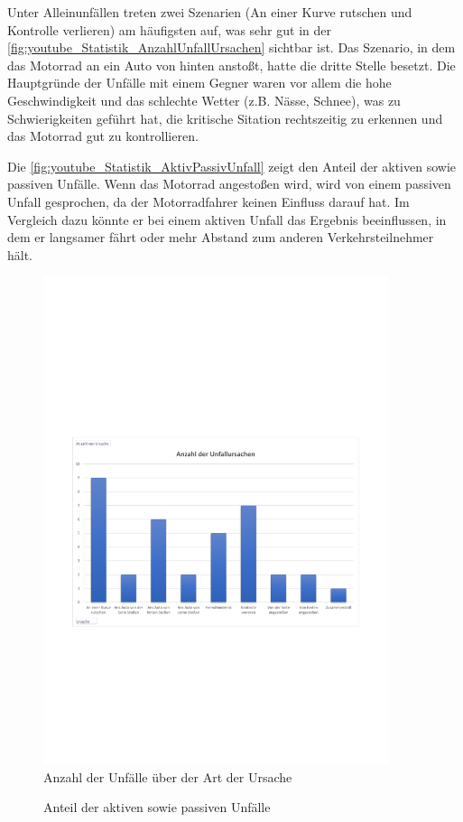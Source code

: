 Unter Alleinunfällen treten zwei Szenarien (An einer Kurve rutschen und Kontrolle verlieren) am häufigsten auf, was sehr gut in der \autoref{fig:youtube_Statistik_AnzahlUnfallUrsachen} sichtbar ist. Das Szenario, in dem das Motorrad an ein Auto von hinten anstoßt, hatte die dritte Stelle besetzt. Die Hauptgründe der Unfälle mit einem Gegner waren vor allem die hohe Geschwindigkeit und das schlechte Wetter (z.B. Nässe, Schnee), was zu Schwierigkeiten geführt hat, die kritische Sitation rechtszeitig zu erkennen und das Motorrad gut zu kontrollieren.

Die \autoref{fig:youtube_Statistik_AktivPassivUnfall} zeigt den Anteil der aktiven sowie passiven Unfälle. Wenn das Motorrad angestoßen wird, wird von einem passiven Unfall gesprochen, da der Motorradfahrer keinen Einfluss darauf hat. Im Vergleich dazu könnte er bei einem aktiven Unfall das Ergebnis beeinflussen, in dem er langsamer fährt oder mehr Abstand zum anderen Verkehrsteilnehmer hält.

\begin{figure}
	\centering
	\includegraphics[width=0.9\textwidth]{Bilder/youtube_Statistik_AnzahlUnfallUrsachen.pdf}
	\caption{Anzahl der Unfälle über der Art der Ursache}
	\label{fig:youtube_Statistik_AnzahlUnfallUrsachen}
\end{figure}
\begin{figure}
	\centering
	\caption{Anteil der aktiven sowie passiven Unfälle}
	\label{fig:youtube_Statistik_AktivPassivUnfall}
\end{figure}

